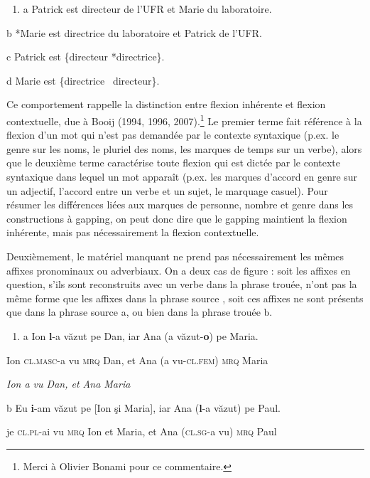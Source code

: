 \begin{enumerate}
\item \label{bkm:Ref298175412}a   Patrick est directeur de l'UFR et Marie du laboratoire. 


\end{enumerate}
  b  *Marie est directrice du laboratoire et Patrick de l'UFR.

  c  Patrick est \{directeur {\textbar} *directrice\}.

  d  Marie est \{directrice {\textbar}~directeur\}.

Ce comportement rappelle la distinction entre flexion inhérente et flexion contextuelle, due à Booij (1994, 1996, 2007).\footnote{Merci à Olivier Bonami pour ce commentaire.} Le premier terme fait référence à la flexion d'un mot qui n'est pas demandée par le contexte syntaxique (p.ex. le genre sur les noms, le pluriel des noms, les marques de temps sur un verbe), alors que le deuxième terme caractérise toute flexion qui est dictée par le contexte syntaxique dans lequel un mot apparaît (p.ex. les marques d'accord en genre sur un adjectif, l'accord entre un verbe et un sujet, le marquage casuel). Pour résumer les différences liées aux marques de personne, nombre et genre dans les constructions à gapping, on peut donc dire que le gapping maintient la flexion inhérente, mais pas nécessairement la flexion contextuelle.

Deuxièmement, le matériel manquant ne prend pas nécessairement les mêmes affixes pronominaux ou adverbiaux. On a deux cas de figure : soit les affixes en question, s'ils sont reconstruits avec un verbe dans la phrase trouée, n'ont pas la même forme que les affixes dans la phrase source , soit ces affixes ne sont présents que dans la phrase source a, ou bien dans la phrase trouée b.


\begin{enumerate}
\item \label{bkm:Ref289300406}a  Ion \textbf{l}-a văzut pe Dan, iar Ana (a văzut-\textbf{o}) pe Maria.


\end{enumerate}
Ion \textsc{cl.masc-}a vu \textsc{mrq} Dan, et Ana (a vu-\textsc{cl.fem) mrq} Maria

{\itshape
Ion a vu Dan, et Ana Maria}

  b  Eu \textbf{i}-am văzut pe [Ion şi Maria], iar Ana (\textbf{l}-a văzut) pe Paul.

    je \textsc{cl.pl-}ai vu \textsc{mrq} Ion et Maria, et Ana (\textsc{cl.sg}-a vu\textsc{) mrq} Paul

